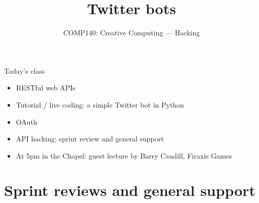 \usepackage{../../beamerthemeFalmouthGamesAcademy}
\usepackage{multimedia}
\graphicspath{ {../../} }


\usepackage[normalem]{ulem}
\usepackage{wasysym}

\usepackage{pdfpages}

\usetikzlibrary{arrows,automata}


\title{Twitter bots}
\subtitle{COMP140: Creative Computing --- Hacking}

\frame{\titlepage} 

\begin{frame}{Today's class}
    \begin{itemize}
        \item RESTful web APIs
        \item Tutorial / live coding: a simple Twitter bot in Python
        \item OAuth
        \item API hacking: sprint review and general support
        \item At 5pm in the Chapel: guest lecture by Barry Caudill, Firaxis Games
    \end{itemize}
\end{frame}





\part{Sprint reviews and general support}
\frame{\partpage}


%


